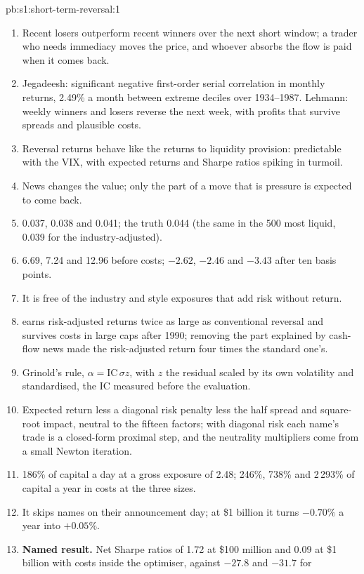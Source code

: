 \begin{solution}{pb:s1:short-term-reversal:1}
\begin{enumerate}
\item Recent losers outperform recent winners over the next short window; a trader who needs immediacy moves the price, and whoever absorbs the flow is paid when
it comes back.
\item Jegadeesh: significant negative first-order serial correlation in monthly returns, 2.49\% a month between extreme deciles over 1934--1987. Lehmann: weekly
winners and losers reverse the next week, with profits that survive spreads and plausible costs.
\item Reversal returns behave like the returns to liquidity provision: predictable with the VIX, with expected returns and Sharpe ratios spiking in turmoil.
\item News changes the value; only the part of a move that is pressure is expected to come back.
\item 0.037, 0.038 and 0.041; the truth 0.044 (the same in the 500 most liquid, 0.039 for the industry-adjusted).
\item 6.69, 7.24 and 12.96 before costs; $-2.62$, $-2.46$ and $-3.43$ after ten basis points.
\item It is free of the industry and style exposures that add risk without return.
\item {} earns risk-adjusted returns twice as large as conventional reversal and survives costs in large caps after 1990; removing the part
explained by cash-flow news made the risk-adjusted return four times the standard one's.
\item Grinold's rule, $\alpha = \mathrm{IC}\,\sigma z$, with $z$ the residual scaled by its own volatility and standardised, the IC measured before the
evaluation.
\item Expected return less a diagonal risk penalty less the half spread and square-root impact, neutral to the fifteen factors; with diagonal risk each name's
trade is a closed-form proximal step, and the neutrality multipliers come from a small Newton iteration.
\item 186\% of capital a day at a gross exposure of 2.48; 246\%, 738\% and 2\,293\% of capital a year in costs at the three sizes.
\item It skips names on their announcement day; at \$1 billion it turns $-0.70\%$ a year into $+0.05\%$.
\item \textbf{Named result.} Net Sharpe ratios of 1.72 at \$100 million and 0.09 at \$1 billion with costs inside the optimiser, against $-27.8$ and $-31.7$ for

\end{enumerate}
\end{solution}
